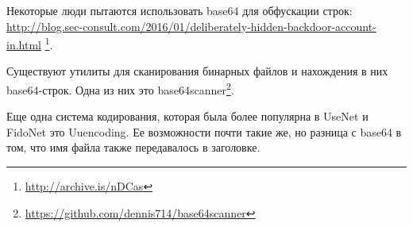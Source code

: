 Некоторые люди пытаются использовать base64 для обфускации строк:
\url{http://blog.sec-consult.com/2016/01/deliberately-hidden-backdoor-account-in.html}
\footnote{\url{http://archive.is/nDCas}}.

Существуют утилиты для сканирования бинарных файлов и нахождения в них base64-строк.
Одна из них это base64scanner\footnote{\url{https://github.com/dennis714/base64scanner}}.

Еще одна система кодирования, которая была более популярна в UseNet и FidoNet это Uuencoding.
Ее возможности почти такие же, но разница с base64 в том, что имя файла также передавалось в заголовке.
